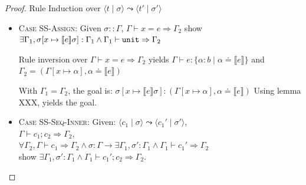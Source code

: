 \documentclass[twoside, english]{sdqthesis}
\newcommand{\tuple}[2]{\langle #1 \mid #2 \rangle}
\newcommand{\bbracket}[1]{\llbracket #1 \rrbracket}
\theoremstyle{definition}
\begin{document}
\begin{proof} Rule Induction over $\tuple{t}{\sigma} \leadsto \tuple{t'}{\sigma'}$
\begin{itemize}
  \item \textsc{Case SS-Assign}:
    Given $\sigma :: \Gamma$, $\Gamma \vdash x = e \Rightarrow \Gamma_2$
    show $\exists \Gamma_1, \sigma[ x \mapsto \llbracket e \rrbracket \sigma] : \Gamma_1 \wedge \Gamma_1 \vdash \code{unit} \Rightarrow \Gamma_2 $

    Rule inversion over $\Gamma \vdash x = e \Rightarrow \Gamma_2$ yields $\Gamma \vdash e: \{ \alpha : b \mid \alpha \doteq \llbracket e \rrbracket \}$ and $\Gamma_2 = (\Gamma[x \mapsto \alpha], \alpha \doteq \llbracket e \rrbracket)$

    With $\Gamma_1 = \Gamma_2$, the goal is: $\sigma[x \mapsto \bbracket{e}\sigma ] : (\Gamma[x \mapsto \alpha], \alpha \doteq \llbracket e \rrbracket)$
    Using lemma XXX, yields the goal.
    




  \item \textsc{Case SS-Seq-Inner}:
    Given: $\tuple{c_1}{\sigma} \leadsto \tuple{c_1'}{\sigma'}$, \\
     $\Gamma \vdash c_1 ; c_2 \Rightarrow \Gamma_2$, \\
     $\forall \Gamma_2, \Gamma \vdash c_1 \Rightarrow \Gamma_2 \wedge \sigma : \Gamma \to \exists \Gamma_1, \sigma' : \Gamma_1 \wedge \Gamma_1 \vdash c_1' \Rightarrow \Gamma_2$ \\
    show $\exists \Gamma_1, \sigma' : \Gamma_1 \wedge \Gamma_1 \vdash c_1' ; c_2  \Rightarrow \Gamma_2$.


\end{itemize}
\end{proof}
\end{document}
